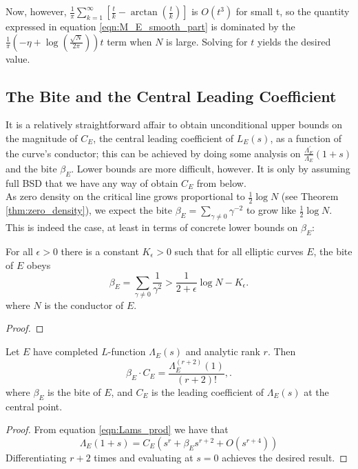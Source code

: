 \documentclass[10pt]{article}
\newcommand{\pr}{^{\prime}}
\newcommand{\Les}{L_E(s)}
\newcommand{\Lams}{\Lambda_E(s)}
\newcommand{\ldLam}[1]{\frac{\Lambda_E\pr}{\Lambda_E}\left(#1\right)}
\begin{document}
Now, however, $\frac{1}{\pi}\sum_{k=1}^{\infty} \left[\frac{t}{k} - \arctan\left(\frac{t}{k}\right)\right]$ is $O(t^3)$ for small t, so the quantity expressed in equation \ref{eqn:M_E_smooth_part} is dominated by the $\frac{1}{\pi}\left(-\eta+\log\left(\frac{\sqrt{N}}{2\pi}\right)\right) t$ term when $N$ is large. Solving for $t$ yields the desired value.

\newpage
\subsection{The Bite and the Central Leading Coefficient}

It is a relatively straightforward affair to obtain unconditional upper bounds on the magnitude of $C_E$, the central leading coefficient of $\Les$, as a function of the curve's conductor; this can be achieved by doing some analysis on $\ldLam{1+s}$ and the bite $\beta_E$. Lower bounds are more difficult, however. It is only by assuming full BSD that we have any way of obtain $C_E$ from below. \\

As zero density on the critical line grows proportional to $\frac{1}{2}\log N$ (see Theorem \ref{thm:zero_density}), we expect the bite $\beta_E = \sum_{\gamma\ne 0} \gamma^{-2}$ to grow like $\frac{1}{2}\log N$. This is indeed the case, at least in terms of concrete lower bounds on $\beta_E$:
\begin{lemma}[S.]
For all $\epsilon>0$ there is a constant $K_{\epsilon}>0$ such that for all elliptic curves $E$, the bite of $E$ obeys
\begin{equation}
\beta_E = \sum_{\gamma\ne 0} \frac{1}{\gamma^2} > \frac{1}{2+\epsilon} \log N - K_{\epsilon}.
\end{equation}
where $N$ is the conductor of $E$.
\end{lemma}
\begin{proof}

\end{proof}

\begin{proposition}\label{prop:bite_times_leading_coeff}
Let $E$ have completed $L$-function $\Lams$ and analytic rank $r$. Then
\begin{equation}
\beta_E\cdot C_E = \frac{\Lambda_E^{(r+2)}(1)}{(r+2)!},.
\end{equation}
where $\beta_E$ is the bite of $E$, and $C_E$ is the leading coefficient of $\Lams$ at the central point.
\end{proposition}
\begin{proof}
From equation \ref{eqn:Lams_prod} we have that 
\begin{equation}
\Lambda_E(1+s) = C_E\left(s^r + \beta_E s^{r+2} + O(s^{r+4})\right)
\end{equation}
Differentiating $r+2$ times and evaluating at $s=0$ achieves the desired result.
\end{proof}
\end{document}
